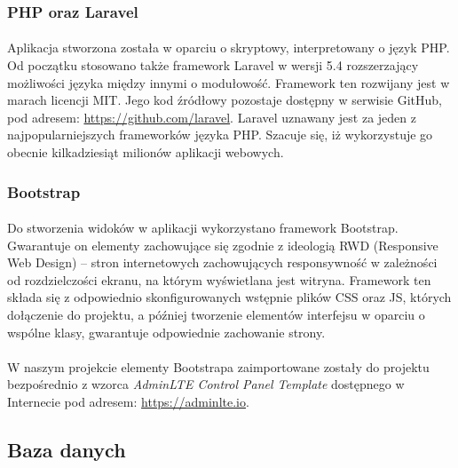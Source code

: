 \documentclass[a4paper, 12pt, oneside]{article}
\begin{document}
			\subsubsection{PHP oraz Laravel}
				\paragraph{} Aplikacja stworzona została w oparciu o skryptowy, interpretowany o język PHP. Od początku stosowano także framework Laravel w wersji 5.4 rozszerzający możliwości języka między innymi o modułowość. Framework ten rozwijany jest w marach licencji MIT. Jego kod źródłowy pozostaje dostępny w serwisie GitHub, pod adresem: \url{https://github.com/laravel}. Laravel uznawany jest za jeden z najpopularniejszych frameworków języka PHP. Szacuje się, iż wykorzystuje go obecnie kilkadziesiąt milionów aplikacji webowych.
			\subsubsection{Bootstrap}
				\paragraph{} Do stworzenia widoków w aplikacji wykorzystano framework Bootstrap. Gwarantuje on elementy zachowujące się zgodnie z ideologią RWD (Responsive Web Design) -- stron internetowych zachowujących responsywność w zależności od rozdzielczości ekranu, na którym wyświetlana jest witryna. Framework ten składa się z odpowiednio skonfigurowanych wstępnie plików CSS oraz JS, których dołączenie do projektu, a później tworzenie elementów interfejsu w oparciu o wspólne klasy, gwarantuje odpowiednie zachowanie strony.
				\paragraph{} W naszym projekcie elementy Bootstrapa zaimportowane zostały do projektu bezpośrednio z wzorca \textit{AdminLTE Control Panel Template} dostępnego w Internecie pod adresem: \url{https://adminlte.io}.  
				
		\subsection{Baza danych}
\end{document}

